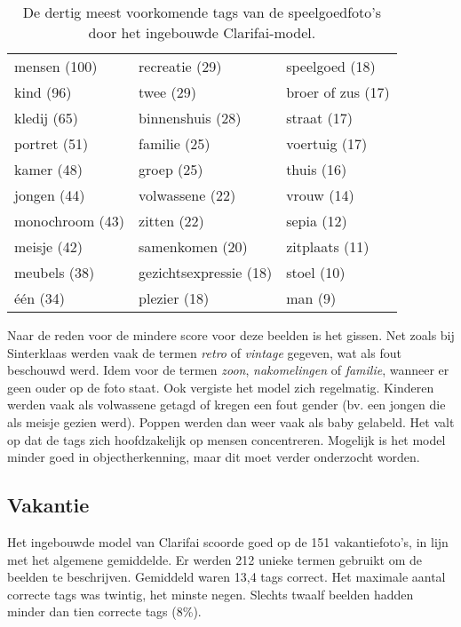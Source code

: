 \begin{table}
	\centering
	\begin{tabular}{*{3}{l}}
		mensen (100) & recreatie (29) & speelgoed (18) \\
		kind (96) & twee (29) & broer of zus (17) \\
		kledij (65) & binnenshuis (28) & straat (17) \\
		portret (51) & familie (25) & voertuig (17) \\
		kamer (48) & groep (25) & thuis (16) \\
		jongen (44) & volwassene (22) & vrouw (14) \\
		monochroom (43) & zitten (22) & sepia (12) \\
		meisje (42) & samenkomen (20) & zitplaats (11) \\
		meubels (38) & gezichtsexpressie (18) & stoel (10) \\
		één (34) & plezier (18) & man (9) \\
	\end{tabular}
	\caption[Dertig meest voorkomende tags van speelgoedfoto's door het ingebouwde model]{De dertig meest voorkomende tags van de speelgoedfoto's door het ingebouwde Clarifai-model.}
	\label{tab:30-termen-speelgoed}
\end{table}

Naar de reden voor de mindere score voor deze beelden is het gissen. Net zoals bij Sinterklaas werden vaak de termen \textit{retro} of \textit{vintage} gegeven, wat als fout beschouwd werd. Idem voor de termen \textit{zoon}, \textit{nakomelingen} of \textit{familie}, wanneer er geen ouder op de foto staat. Ook vergiste het model zich regelmatig. Kinderen werden vaak als volwassene getagd of kregen een fout gender (bv. een jongen die als meisje gezien werd). Poppen werden dan weer vaak als baby gelabeld. Het valt op dat de tags zich hoofdzakelijk op mensen concentreren. Mogelijk is het model minder goed in objectherkenning, maar dit moet verder onderzocht worden.

\subsection{Vakantie}

Het ingebouwde model van Clarifai scoorde goed op de 151 vakantiefoto’s, in lijn met het algemene gemiddelde.  Er werden 212 unieke termen gebruikt om de beelden te beschrijven. Gemiddeld waren 13,4 tags correct. Het maximale aantal correcte tags was twintig, het minste negen. Slechts twaalf beelden hadden minder dan tien correcte tags (8\%).

